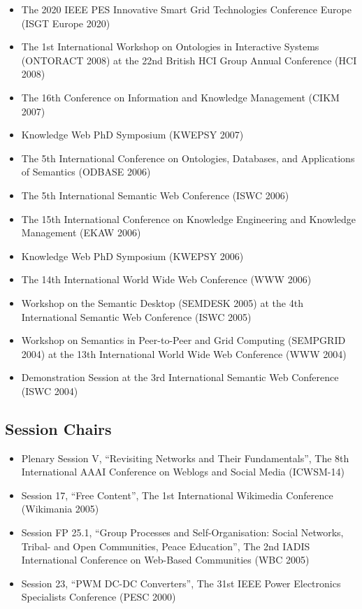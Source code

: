 \documentclass[10pt,a4paper]{res} %
\begin{document}
\begin{resume}
\begin{itemize} \itemsep -2pt
\item The 2020 IEEE PES Innovative Smart Grid Technologies Conference Europe (ISGT Europe 2020)
\item The 1st International Workshop on Ontologies in Interactive Systems (ONTORACT 2008) at the 22nd British HCI Group Annual Conference (HCI 2008)
\item The 16th Conference on Information and Knowledge Management (CIKM 2007)
\item Knowledge Web PhD Symposium (KWEPSY 2007)
\item The 5th International Conference on Ontologies, Databases, and Applications of Semantics (ODBASE 2006)
\item The 5th International Semantic Web Conference (ISWC 2006)
\item The 15th International Conference on Knowledge Engineering and Knowledge Management (EKAW 2006)
\item Knowledge Web PhD Symposium (KWEPSY 2006)
\item The 14th International World Wide Web Conference (WWW 2006)
\item Workshop on the Semantic Desktop (SEMDESK 2005) at the 4th International Semantic Web Conference (ISWC 2005)
\item Workshop on Semantics in Peer-to-Peer and Grid Computing (SEMPGRID 2004) at the 13th International World Wide Web Conference (WWW 2004)
\item Demonstration Session at the 3rd International Semantic Web Conference (ISWC 2004)
\end{itemize}

\subsection*{Session Chairs}

\begin{itemize} \itemsep -2pt
\item Plenary Session V, ``Revisiting Networks and Their Fundamentals'', The 8th International AAAI Conference on Weblogs and Social Media (ICWSM-14)
\item Session 17, ``Free Content'', The 1st International Wikimedia Conference (Wikimania 2005)
\item Session FP 25.1, ``Group Processes and Self-Organisation: Social Networks, Tribal- and Open Communities, Peace Education'', The 2nd IADIS International Conference on Web-Based Communities (WBC 2005)
\item Session 23, ``PWM DC-DC Converters'', The 31st IEEE Power Electronics Specialists Conference (PESC 2000)
\end{itemize}


\end{resume}
\end{document}

